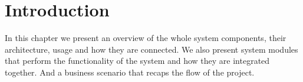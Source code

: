 \newline
\newline
\vspace{3mm}
\hfill
\section{Introduction}
\hspace{2cm} In this chapter we present an overview of the whole system components, their architecture, usage and how they are connected. We also present system modules that perform the functionality of the system and how they are integrated together. And a business scenario that recaps the flow of the project.